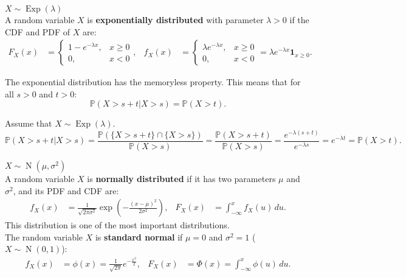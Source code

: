 \documentclass{huhtakm-template-book-v2}
\newcommand{\prob}{\mathbb{P}}
\DeclareMathOperator{\Exp}{Exp}
\DeclareMathOperator{\N}{N}
\begin{document}
    \begin{eg} $X \sim \Exp(\lambda)$\\
        A random variable $X$ is \textbf{exponentially distributed} with parameter $\lambda > 0$ if the CDF and PDF of $X$ are:
        \begin{align*}
            F_{X}(x) &= \begin{cases}
                1-e^{-\lambda x}, &x \geq 0\\
                0, &x < 0
            \end{cases}, & f_{X}(x) &= \begin{cases}
                \lambda e^{-\lambda x}, &x \geq 0\\
                0, &x < 0
            \end{cases} = \lambda e^{-\lambda x}\mathbf{1}_{x \geq 0}.
        \end{align*}
    \end{eg}
    \begin{thm}
        The exponential distribution has the memoryless property. This means that for all $s > 0$ and $t > 0$:
        \begin{equation*}
            \prob(X > s+t|X > s) = \prob(X > t).
        \end{equation*}
    \end{thm}
    \begin{proofing}
        Assume that $X \sim \Exp(\lambda)$.
        \begin{equation*}
            \prob(X > s+t|X > s) = \frac{\prob(\{X > s+t\}\cap\{X > s\})}{\prob(X > s)} = \frac{\prob(X > s+t)}{\prob(X > s)} = \frac{e^{-\lambda(s+t)}}{e^{-\lambda s}} = e^{-\lambda t} = \prob(X > t).
        \end{equation*}
    \end{proofing}
    \begin{eg} $X \sim \N(\mu,\sigma^{2})$\\
        A random variable $X$ is \textbf{normally distributed} if it has two parameters $\mu$ and $\sigma^{2}$, and its PDF and CDF are:
        \begin{align*}
            f_{X}(x) &= \frac{1}{\sqrt{2\pi\sigma^{2}}}\exp\left(-\frac{(x-\mu)^{2}}{2\sigma^{2}}\right), & F_{X}(x) &= \int_{-\infty}^{x}f_{X}(u)\,du.
        \end{align*}
        This distribution is one of the most important distributions.\\
        The random variable $X$ is \textbf{standard normal} if $\mu = 0$ and $\sigma^{2} = 1$ ($X \sim \N(0,1)$):
        \begin{align*}
            f_{X}(x) &= \phi(x) = \frac{1}{\sqrt{2\pi}}e^{-\frac{x^{2}}{2}}, & F_{X}(x) &= \Phi(x) = \int_{-\infty}^{x}\phi(u)\,du.
        \end{align*}
    \end{eg}
\end{document}
